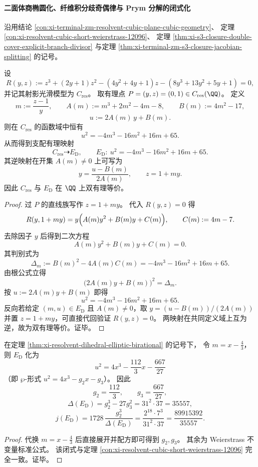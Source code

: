 \paragraph{二面体商椭圆化、纤维积分歧奇偶律与 Prym 分解的闭式化}
沿用结论 \ref{con:xi-terminal-zm-resolvent-cubic-plane-cubic-geometry}、
定理 \ref{con:xi-resolvent-cubic-short-weierstrass-12096}、
定理 \ref{thm:xi-s3-closure-double-cover-explicit-branch-divisor}
与定理 \ref{thm:xi-terminal-zm-s3-closure-jacobian-splitting} 的记号。

\begin{theorem}\label{thm:xi-resolvent-dihedral-elliptic-birational}
设
\[
R(y,z):=z^{3}+(2y+1)z^{2}-(4y^{2}+4y+1)z-(8y^{3}+13y^{2}+5y+1)=0,
\]
并记其射影光滑模型为 \(C_{\mathrm{res}}\)。
取有理点 \(P=(y,z)=(0,1)\in C_{\mathrm{res}}(\QQ)\)。
定义
\[
m:=\frac{z-1}{y},\qquad
A(m):=m^{3}+2m^{2}-4m-8,\qquad
B(m):=4m^{2}-17,
\]
\[
u:=2A(m)\,y+B(m).
\]
则在 \(C_{\mathrm{res}}\) 的函数域中恒有
\[
u^{2}=-4m^{3}-16m^{2}+16m+65.
\]
从而得到支配有理映射
\[
C_{\mathrm{res}}\dashrightarrow E_{\mathrm D},\qquad
E_{\mathrm D}:\ u^{2}=-4m^{3}-16m^{2}+16m+65.
\]
其逆映射在开集 \(A(m)\neq 0\) 上可写为
\[
y=\frac{u-B(m)}{2A(m)},\qquad z=1+my.
\]
因此 \(C_{\mathrm{res}}\) 与 \(E_{\mathrm D}\) 在 \(\QQ\) 上双有理等价。
\end{theorem}
\begin{proof}
过 \(P\) 的直线族写作 \(z=1+my\)。
代入 \(R(y,z)=0\) 得
\[
R(y,1+my)=y\Bigl(A(m)y^{2}+B(m)y+C(m)\Bigr),\qquad C(m):=4m-7.
\]
去除因子 \(y\) 后得到二次方程
\[
A(m)y^{2}+B(m)y+C(m)=0.
\]
其判别式为
\[
\Delta_m:=B(m)^2-4A(m)C(m)=-4m^{3}-16m^{2}+16m+65.
\]
由根公式立得
\[
\bigl(2A(m)y+B(m)\bigr)^2=\Delta_m.
\]
按 \(u:=2A(m)y+B(m)\) 即得
\[
u^{2}=-4m^{3}-16m^{2}+16m+65.
\]
反向若给定 \((m,u)\in E_{\mathrm D}\) 且 \(A(m)\neq 0\)，取
\(
y=(u-B(m))/(2A(m))
\) 并置 \(z=1+my\)，可直接代回验证 \(R(y,z)=0\)。
两映射在共同定义域上互为逆，故为双有理等价。证毕。
\end{proof}



\begin{corollary}\label{cor:xi-ed-discriminant-j-closed-form}
在定理 \ref{thm:xi-resolvent-dihedral-elliptic-birational} 的记号下，
令 \(m=x-\frac43\)，则 \(E_{\mathrm D}\) 化为
\[
u^{2}=4x^{3}-\frac{112}{3}x-\frac{667}{27}
\]
（即 \(\wp\)-形式 \(u^2=4x^3-g_2x-g_3\)）。
因此
\[
g_2=\frac{112}{3},\qquad g_3=\frac{667}{27},
\]
\[
\Delta(E_{\mathrm D})=g_2^3-27g_3^2=31^2\cdot 37=35557,
\]
\[
j(E_{\mathrm D})
=1728\,\frac{g_2^3}{\Delta(E_{\mathrm D})}
=\frac{2^{18}\cdot 7^3}{31^2\cdot 37}
=\frac{89915392}{35557}.
\]
\end{corollary}
\begin{proof}
代换 \(m=x-\frac43\) 后直接展开并配方即可得到 \(g_2,g_3\)。
其余为 Weierstrass 不变量标准公式。
该闭式与定理 \ref{con:xi-resolvent-cubic-short-weierstrass-12096} 完全一致。证毕。
\end{proof}

